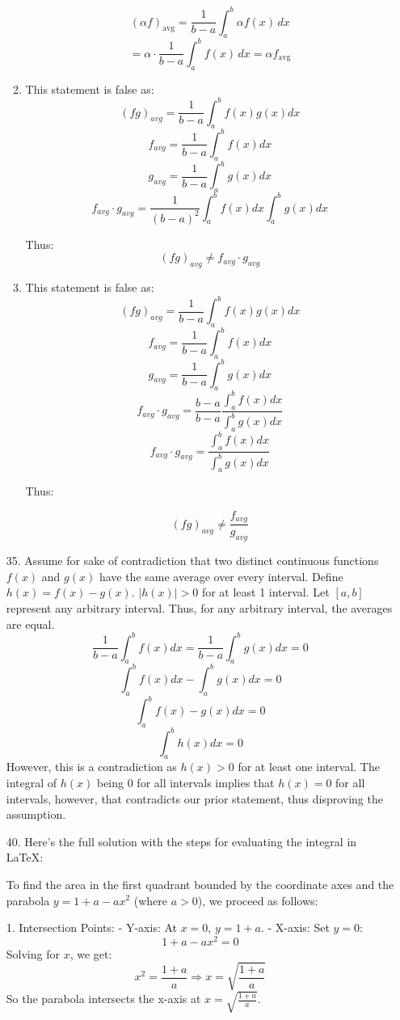 \documentclass[12pt]{article}
\begin{document}
\begin{enumerate}[start=1,label={\bfseries. },leftmargin=1in]
\begin{enumerate}
\[
(\alpha f)_{\text{avg}} = \frac{1}{b - a} \int_a^b \alpha f(x) \, dx 
\]
\[
= \alpha \cdot \frac{1}{b - a} \int_a^b f(x) \, dx = \alpha f_{\text{avg}}
\]

\item This statement is false as:
\[
(fg)_{avg} = \frac{1}{b - a} \int_a^b f(x) g(x)dx
\]
\[
f_{avg} = \frac{1}{b - a} \int_a^b f(x)dx
\]
\[
g_{avg} = \frac{1}{b - a} \int_a^b g(x)dx
\]
\[
f_{avg}\cdot g_{avg} = \frac{1}{(b-a)^2}\int_a^b f(x)dx\int_a^b g(x)dx
\]

Thus: 
\[
(fg)_{avg} \neq f_{avg}\cdot g_{avg}
\]


\item This statement is false as:
\[
(fg)_{avg} = \frac{1}{b - a} \int_a^b f(x) g(x)dx
\]
\[
f_{avg} = \frac{1}{b - a} \int_a^b f(x)dx
\]
\[
g_{avg} = \frac{1}{b - a} \int_a^b g(x)dx
\]
\[
f_{avg}\cdot g_{avg} = \frac{b-a}{b-a}\frac{\int_a^b f(x)dx}{\int_a^b g(x)dx}
\]
\[
f_{avg}\cdot g_{avg} = \frac{\int_a^b f(x)dx}{\int_a^b g(x)dx}
\]

Thus:

\[
(fg)_{avg} \neq \frac{f_{avg}}{g_{avg}}
\]


\end{enumerate}

\item [35. ]
Assume for sake of contradiction that two distinct continuous functions $f(x)$ and $g(x)$ have the same average over every interval. Define $h(x) = f(x) - g(x)$. $|h(x)| > 0$ for at least 1 interval. 
Let $[a,b]$ represent any arbitrary interval. Thus, for any arbitrary interval, the averages are equal. 
\[
\frac{1}{b-a}\int_a^bf(x)dx = \frac{1}{b-a}\int_a^bg(x)dx = 0
\]
\[
\int_a^bf(x)dx - \int_a^bg(x)dx = 0
\]
\[
\int_a^b f(x) - g(x) dx = 0
\]
\[
\int_a^bh(x) dx= 0
\]
However, this is a contradiction as $h(x) > 0$ for at least one interval. The integral of $h(x)$ being 0 for all intervals implies that $h(x) = 0$ for all intervals, however, that contradicts our prior statement, thus disproving the assumption.

\item [40. ]
Here’s the full solution with the steps for evaluating the integral in LaTeX:

To find the area in the first quadrant bounded by the coordinate axes and the parabola \( y = 1 + a - ax^2 \) (where \( a > 0 \)), we proceed as follows:

1. Intersection Points:
   - Y-axis: At \( x = 0 \), \( y = 1 + a \).
   - X-axis: Set \( y = 0 \):
     \[
     1 + a - ax^2 = 0
     \]
     Solving for \( x \), we get:
     \[
     x^2 = \frac{1 + a}{a} \Rightarrow x = \sqrt{\frac{1 + a}{a}}
     \]
   So the parabola intersects the x-axis at \( x = \sqrt{\frac{1 + a}{a}} \).


\end{enumerate}
\end{document}
